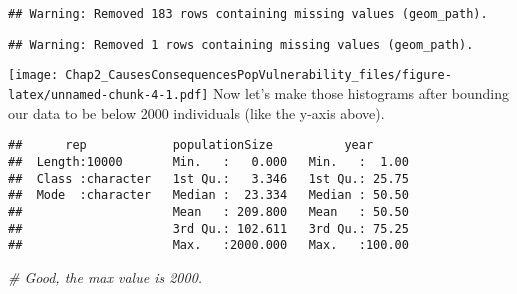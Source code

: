 \documentclass[]{article}
\newenvironment{Shaded}{\begin{snugshade}}{\end{snugshade}}
\newcommand{\KeywordTok}[1]{\textcolor[rgb]{0.13,0.29,0.53}{\textbf{#1}}}
\newcommand{\DataTypeTok}[1]{\textcolor[rgb]{0.13,0.29,0.53}{#1}}
\newcommand{\DecValTok}[1]{\textcolor[rgb]{0.00,0.00,0.81}{#1}}
\newcommand{\StringTok}[1]{\textcolor[rgb]{0.31,0.60,0.02}{#1}}
\newcommand{\CommentTok}[1]{\textcolor[rgb]{0.56,0.35,0.01}{\textit{#1}}}
\newcommand{\OperatorTok}[1]{\textcolor[rgb]{0.81,0.36,0.00}{\textbf{#1}}}
\newcommand{\NormalTok}[1]{#1}
\begin{document}
\begin{verbatim}
## Warning: Removed 183 rows containing missing values (geom_path).
\end{verbatim}

\begin{verbatim}
## Warning: Removed 1 rows containing missing values (geom_path).
\end{verbatim}

\texttt{[image: Chap2\_CausesConsequencesPopVulnerability\_files/figure-latex/unnamed-chunk-4-1.pdf]}
Now let's make those histograms after bounding our data to be below 2000
individuals (like the y-axis above).

\begin{Shaded}
\end{Shaded}

\begin{verbatim}
##      rep            populationSize          year       
##  Length:10000       Min.   :   0.000   Min.   :  1.00  
##  Class :character   1st Qu.:   3.346   1st Qu.: 25.75  
##  Mode  :character   Median :  23.334   Median : 50.50  
##                     Mean   : 209.800   Mean   : 50.50  
##                     3rd Qu.: 102.611   3rd Qu.: 75.25  
##                     Max.   :2000.000   Max.   :100.00
\end{verbatim}

\begin{Shaded}
\begin{Highlighting}[]
\CommentTok{# Good, the max value is 2000.}
\end{Highlighting}
\end{Shaded}

\begin{Shaded}
\end{Shaded}
\end{document}
